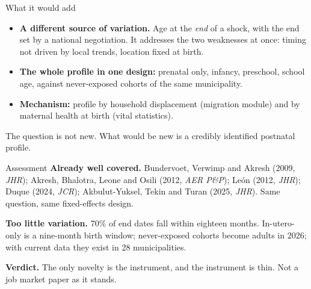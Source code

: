 \documentclass[aspectratio=169,11pt]{beamer}
\newcommand{\muted}[1]{{\color{muted}#1}}
\begin{document}
\begin{frame}{What it would add}
\begin{itemize}
\item \textbf{A different source of variation.} Age at the \emph{end} of a shock, with the end set by a national negotiation. It addresses the two weaknesses at once: timing not driven by local trends, location fixed at birth.
\item \textbf{The whole profile in one design:} prenatal only, infancy, preschool, school age, against never-exposed cohorts of the same municipality.
\item \textbf{Mechanism:} profile by household displacement (migration module) and by maternal health at birth (vital statistics).
\end{itemize}
\vspace{0.6em}
\muted{The question is not new. What would be new is a credibly identified postnatal profile.}
\end{frame}

\begin{frame}{Assessment}
\textbf{Already well covered.} Bundervoet, Verwimp and Akresh (2009, \emph{JHR}); Akresh, Bhalotra, Leone and Osili (2012, \emph{AER P\&P}); León (2012, \emph{JHR}); Duque (2024, \emph{JCR}); Akbulut-Yuksel, Tekin and Turan (2025, \emph{JHR}). Same question, same fixed-effects design.
\vspace{0.7em}

\textbf{Too little variation.} 70\% of end dates fall within eighteen months. In-utero-only is a nine-month birth window; never-exposed cohorts become adults in 2026; with current data they exist in 28 municipalities.
\vspace{0.7em}

\textbf{Verdict.} The only novelty is the instrument, and the instrument is thin. Not a job market paper as it stands.
\end{frame}
\end{document}
